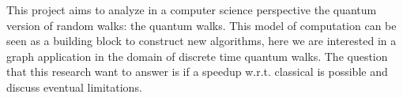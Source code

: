 
This project aims to analyze in a computer science perspective the quantum version of random walks: the quantum walks. This model of computation can be seen as a 
building block to construct new algorithms, here we are interested in a graph application in the domain of discrete time quantum walks. The question that this research 
want to answer is if a speedup w.r.t. classical is possible and discuss eventual limitations. 


